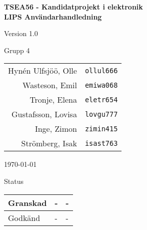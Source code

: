 \documentclass[11pt]{article}
\begin{document}
\begin{titlepage}
\begin{center}

{\Large\bfseries TSEA56 - Kandidatprojekt i elektronik \\ LIPS Användarhandledning}

\vspace{5em}

Version 1.0

\vspace{5em}
Grupp 4 \\
\begin{tabular}{rl}
Hynén Ulfsjöö, Olle&\verb+ollul666+
\\
Wasteson, Emil&\verb+emiwa068+
\\
Tronje, Elena&\verb+eletr654+
\\
Gustafsson, Lovisa&\verb+lovgu777+
\\
Inge, Zimon&\verb+zimin415+
\\
Strömberg, Isak&\verb+isast763+
\\
\end{tabular}

\vspace{5em}
\today

\vspace{16em}
Status
\begin{longtable}{|l|l|l|} \hline

Granskad & - & - \\ \hline
Godkänd & - & - \\ \hline
 
\end{longtable}

\end{center}
\end{titlepage}
\end{document}
